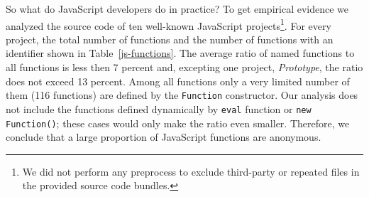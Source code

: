 \documentclass[10pt, preprint]{sigplanconf}
\begin{document}
\begin{table}%

\centering
{}
\caption{The total number of functions and the number of named functions (and percent named)  in ten large JavaScript projects. See appendix 1 for the project citations.} 
\label{js-functions} 
\end{table} 


So what do JavaScript developers do in practice?  To get empirical evidence we analyzed the source code of ten well-known JavaScript projects\footnote[2]{We did not perform any preprocess to exclude third-party or repeated files in the provided source code bundles.}. For every project, the total number of functions and the number of functions with an identifier shown in Table~\ref{js-functions}. The average ratio of named functions to all functions is less then 7 percent and, excepting one project, \textit{Prototype}, the ratio does not exceed 13 percent. Among all functions only a very limited number of them (116 functions) are defined by the \verb|Function| constructor. Our analysis does not include the functions defined dynamically by \verb|eval| function or \verb|new Function()|; these cases would only make the ratio even smaller.  Therefore, we conclude that a large proportion of JavaScript functions are anonymous.
\end{document}
